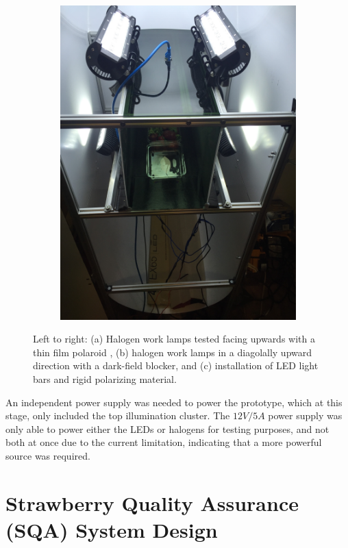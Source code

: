 \documentclass[fleqn,twoside,12pt]{report}
\begin{document}
\begin{figure}[h]
\begin{subfigure}{.32\textwidth}
		\includegraphics[width=\linewidth,angle=270,origin=c]{bench_led_rigid.jpg}
		\caption{}
		\label{fig:bench_led_rigid}
	\end{subfigure}%
	\caption{Left to right: (a) Halogen work lamps tested facing upwards with a thin film polaroid , (b) halogen work lamps in a diagolally upward direction with a dark-field blocker, and (c) installation of LED light bars and rigid polarizing material.}
	\label{fig:test3}
\end{figure}


An independent power supply was needed to power the prototype, which at this stage, only included the top illumination cluster. The $12V/5A$ power supply was only able to power either the LEDs or halogens for testing purposes, and not both at once due to the current limitation, indicating that a more powerful source was required.   





\section{Strawberry Quality Assurance (SQA) System Design}
\end{document}
